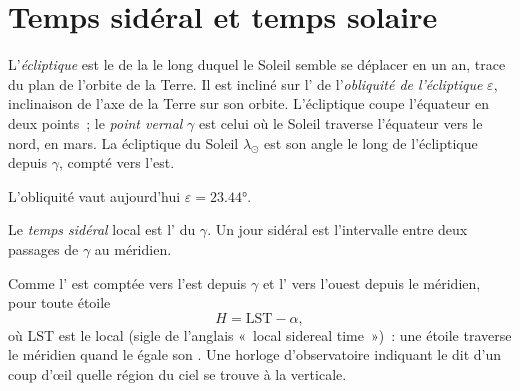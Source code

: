 \section{Temps sidéral et temps solaire}

\begin{definition}[L'écliptique]\label{def:b1:spherical-astronomy:ecliptic}
L'\emph{écliptique} est le  de la
 le long duquel le Soleil semble se déplacer en un an, trace du
plan de l'orbite de la Terre. Il est incliné sur l' de
l'\emph{obliquité de l'écliptique}
$\varepsilon$, inclinaison de l'axe de la Terre sur son orbite. L'écliptique
coupe l'équateur en deux points~; le \emph{point vernal} $\gamma$ est
celui où le Soleil traverse l'équateur vers le nord, en mars. La 
écliptique du Soleil $\lambda_\odot$ est son angle le long de l'écliptique
depuis $\gamma$, compté vers l'est.
\end{definition}

L'obliquité vaut aujourd'hui $\varepsilon = \ang{23.44}$.

\begin{definition}\label{def:b1:spherical-astronomy:sidereal-time}
Le \emph{temps sidéral} local est l' du  $\gamma$. Un
jour sidéral est l'intervalle entre deux passages de $\gamma$ au méridien.
\end{definition}

Comme l' est comptée vers l'est depuis $\gamma$ et l' vers l'ouest depuis le méridien, pour toute étoile
\[
  H = \mathrm{LST} - \alpha ,
\]
où LST est le  local (sigle de l'anglais «~local sidereal
time~»)~: une étoile traverse le méridien quand le  égale son
. Une horloge d'observatoire indiquant le  dit
d'un coup d'œil quelle région du ciel se trouve à la verticale.


